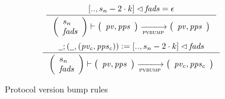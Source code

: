 \begin{figure}[htb]
  \begin{equation}
    \label{eq:rule:pvbump-change-epoch-only}
    \inference
    {
      [.., s_n - 2 \cdot k] \restrictdom \var{fads} = \epsilon
    }
    {
      {\left(\begin{array}{l}
         s_n\\
         \var{fads}
       \end{array}\right)}
      \vdash
      {
        \left(
          \begin{array}{l}
            \var{pv}, \var{pps}\\
          \end{array}
        \right)
      }
      \trans{pvbump}{}
      {
        \left(
          \begin{array}{l}
            \var{pv}, \var{pps}\\
          \end{array}
        \right)
      }
    }
  \end{equation}
  \nextdef
  \begin{equation}
    \label{eq:rule:pvbump-change}
    \inference
    {
      \wcard ; (\wcard , (\var{pv_c}, \var{pps_c})) \leteq [.., s_n - 2 \cdot k] \restrictdom \var{fads}
    }
    {
      {\left(\begin{array}{l}
         s_n\\
         \var{fads}
       \end{array}\right)}
      \vdash
      {
        \left(
          \begin{array}{l}
            \var{pv}, \var{pps}\\
          \end{array}
        \right)
      }
      \trans{pvbump}{}
      {
        \left(
          \begin{array}{l}
            \var{pv_c}, \var{pps_c}\\
          \end{array}
        \right)
      }
    }
  \end{equation}
  \caption{Protocol version bump rules}
  \label{fig:rules:pvbump}
\end{figure}

